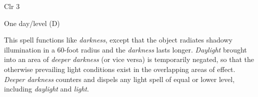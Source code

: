 
\begin{description*}
\item[Level:] Clr 3
\item[Duration:] One day/level (D)
\end{description*}

This spell functions like \textit{darkness}, except that the object radiates shadowy
illumination in a 60-foot radius and the \textit{darkness} lasts longer.
\textit{Daylight} brought into an area of \textit{deeper darkness} (or vice versa)
is temporarily negated, so that the otherwise prevailing light conditions exist
in the overlapping areas of effect.
\textit{Deeper darkness} counters and dispels any light spell of equal or lower
level, including \textit{daylight} and \textit{light}.